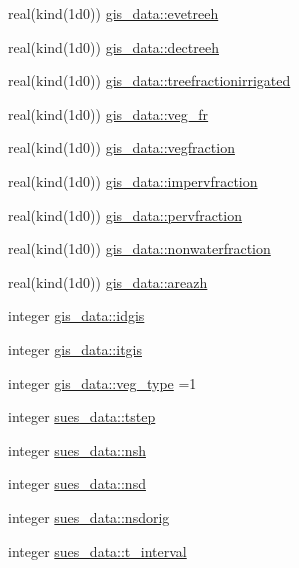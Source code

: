\begin{DoxyCompactItemize}
\item 
real(kind(1d0)) \hyperlink{namespacegis__data_a2eab7550922ec226bac9160b71203e83}{gis\+\_\+data\+::evetreeh}
\item 
real(kind(1d0)) \hyperlink{namespacegis__data_a4f60c63599a3076e7b8ffabbcaa57405}{gis\+\_\+data\+::dectreeh}
\item 
real(kind(1d0)) \hyperlink{namespacegis__data_adf2d66b8c91265b1373f86153ba0a07c}{gis\+\_\+data\+::treefractionirrigated}
\item 
real(kind(1d0)) \hyperlink{namespacegis__data_a16985ccbad5040769f8cd039103c4f15}{gis\+\_\+data\+::veg\+\_\+fr}
\item 
real(kind(1d0)) \hyperlink{namespacegis__data_a092cc07d2d55535e1995ac1196dac36a}{gis\+\_\+data\+::vegfraction}
\item 
real(kind(1d0)) \hyperlink{namespacegis__data_af2e0c2e076d483696937dc3732bd0fc2}{gis\+\_\+data\+::impervfraction}
\item 
real(kind(1d0)) \hyperlink{namespacegis__data_aafb1e051dfaaf0a04760dc14acf4b053}{gis\+\_\+data\+::pervfraction}
\item 
real(kind(1d0)) \hyperlink{namespacegis__data_a33f200820c4bd251ccc75f2cf5ca8f04}{gis\+\_\+data\+::nonwaterfraction}
\item 
real(kind(1d0)) \hyperlink{namespacegis__data_a59a6c27dbdfd939e15369ac064221241}{gis\+\_\+data\+::areazh}
\item 
integer \hyperlink{namespacegis__data_ada1260f672e04bbd0157fc95c2e36b91}{gis\+\_\+data\+::idgis}
\item 
integer \hyperlink{namespacegis__data_aeaf96e2a9b1651309ef3645d9277a439}{gis\+\_\+data\+::itgis}
\item 
integer \hyperlink{namespacegis__data_a9cc38462906e83260e293f5b447c4374}{gis\+\_\+data\+::veg\+\_\+type} =1
\item 
integer \hyperlink{namespacesues__data_ac6af955be55f5fe026b4ba1ab6ec480e}{sues\+\_\+data\+::tstep}
\item 
integer \hyperlink{namespacesues__data_ab28124e60c813d253c9b095050fe3ebe}{sues\+\_\+data\+::nsh}
\item 
integer \hyperlink{namespacesues__data_a1fd9bd64afb3354e7e90260d0f0c6e94}{sues\+\_\+data\+::nsd}
\item 
integer \hyperlink{namespacesues__data_aa6fc5b2432c730d5b950fa2b37ac4630}{sues\+\_\+data\+::nsdorig}
\item 
integer \hyperlink{namespacesues__data_a91f69564eaa9aa824c0043d532502229}{sues\+\_\+data\+::t\+\_\+interval}

\end{DoxyCompactItemize}

